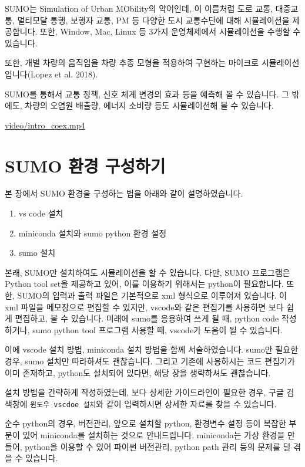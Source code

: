 \documentclass[
  letterpaper,
  DIV=11,
  numbers=noendperiod]{scrreprt}
\providecommand{\tightlist}{%
  \setlength{\itemsep}{0pt}\setlength{\parskip}{0pt}}
\begin{document}
SUMO는 Simulation of Urban MObility의 약어인데, 이 이름처럼 도로 교통,
대중교통, 멀티모달 통행, 보행자 교통, PM 등 다양한 도시 교통수단에 대해
시뮬레이션을 제공합니다. 또한, Window, Mac, Linux 등 3가지 운영체제에서
시뮬레이션을 수행할 수 있습니다.

또한, 개별 차량의 움직임을 차량 추종 모형을 적용하여 구현하는 마이크로
시뮬레이션입니다(Lopez et al. 2018).

SUMO를 통해서 교통 정책, 신호 체계 변경의 효과 등을 예측해 볼 수
있습니다. 그 밖에도, 차량의 오염원 배출량, 에너지 소비량 등도
시뮬레이션해 볼 수 있습니다.

\url{video/intro_coex.mp4}

\part{SUMO 환경 구성하기}

본 장에서 SUMO 환경을 구성하는 법을 아래와 같이 설명하였습니다.

\begin{enumerate}
\def\labelenumi{\arabic{enumi}.}
\tightlist
\item
  vs code 설치
\item
  miniconda 설치와 sumo python 환경 설정
\item
  sumo 설치
\end{enumerate}

본래, SUMO만 설치하여도 시뮬레이션을 할 수 있습니다. 다만, SUMO
프로그램은 Python tool set을 제공하고 있어, 이를 이용하기 위해서는
python이 필요합니다. 또한, SUMO의 입력과 출력 파일은 기본적으로 xml
형식으로 이루어져 있습니다. 이 xml 파일을 메모장으로 편집할 수 있지만,
vscode와 같은 편집기를 사용하면 보다 쉽게 편집하고, 볼 수 있습니다.
미래에 sumo를 응용하여 쓰게 될 때, python code 작성하거나, sumo python
tool 프로그램 사용할 때, vscode가 도움이 될 수 있습니다.

이에 vscode 설치 방법, miniconda 설치 방법을 함께 서술하였습니다. sumo만
필요한 경우, sumo 설치만 따라하셔도 괜찮습니다. 그리고 기존에 사용하시는
코드 편집기가 이미 존재하고, python도 설치되어 있다면, 해당 장을
생략하셔도 괜찮습니다.

설치 방법을 간략하게 작성하였는데, 보다 상세한 가이드라인이 필요한 경우,
구글 검색창에 \texttt{윈도우\ vscdoe\ 설치}와 같이 입력하시면 상세한
자료를 찾을 수 있습니다.

순수 python의 경우, 버전관리, 앞으로 설치할 python, 환경변수 설정 등이
복잡한 부분이 있어 miniconda를 설치하는 것으로 안내드립니다. miniconda는
가상 환경을 만들어, python을 이용할 수 있어 파이썬 버전관리, python path
관리 등의 문제를 덜 겪을 수 있습니다.
\end{document}
